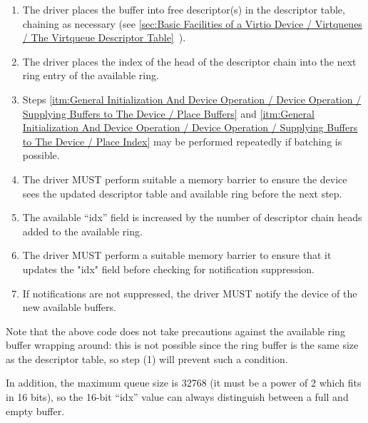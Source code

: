 \begin{enumerate}
\item\label{itm:General Initialization And Device Operation / Device Operation / Supplying Buffers to The Device / Place Buffers} The driver places the buffer into free descriptor(s) in the
   descriptor table, chaining as necessary (see \ref{sec:Basic Facilities of a Virtio Device / Virtqueues / The Virtqueue Descriptor Table}~).

\item\label{itm:General Initialization And Device Operation / Device Operation / Supplying Buffers to The Device / Place Index} The driver places the index of the head of the descriptor chain
   into the next ring entry of the available ring.

\item Steps \ref{itm:General Initialization And Device Operation / Device Operation / Supplying Buffers to The Device / Place Buffers} and \ref{itm:General Initialization And Device Operation / Device Operation / Supplying Buffers to The Device / Place Index} may be performed repeatedly if batching
  is possible.

\item The driver MUST perform suitable a memory barrier to ensure the device sees
  the updated descriptor table and available ring before the next
  step.

\item The available “idx” field is increased by the number of
  descriptor chain heads added to the available ring.

\item The driver MUST perform a suitable memory barrier to ensure that it updates
  the "idx" field before checking for notification suppression.

\item If notifications are not suppressed, the driver MUST notify the device
    of the new available buffers.
\end{enumerate}

Note that the above code does not take precautions against the
available ring buffer wrapping around: this is not possible since
the ring buffer is the same size as the descriptor table, so step
(1) will prevent such a condition.

In addition, the maximum queue size is 32768 (it must be a power
of 2 which fits in 16 bits), so the 16-bit “idx” value can always
distinguish between a full and empty buffer.

